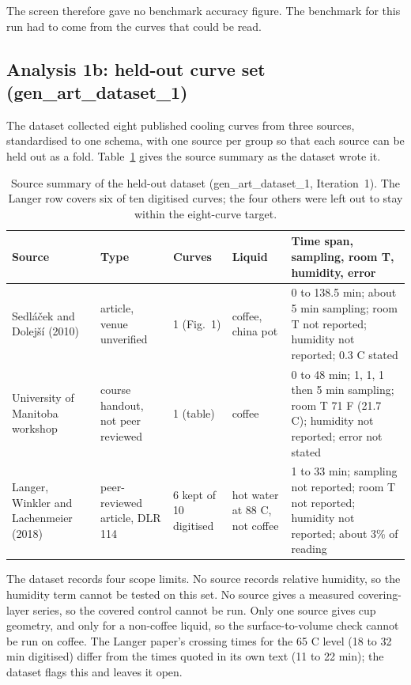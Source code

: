 \documentclass[11pt,letterpaper]{article}
\begin{document}
The screen therefore gave no benchmark accuracy figure. The benchmark for this run had to come from the curves that could be read.

\subsection{Analysis 1b: held-out curve set (gen\_art\_dataset\_1)}

The dataset collected eight published cooling curves from three sources, standardised to one schema, with one source per group so that each source can be held out as a fold. Table~\ref{tab:it1-sources} gives the source summary as the dataset wrote it.

\begin{table}[!htbp]
\centering
\small
\caption{Source summary of the held-out dataset (gen\_art\_dataset\_1, Iteration~1). The Langer row covers six of ten digitised curves; the four others were left out to stay within the eight-curve target.}
\label{tab:it1-sources}
\begin{tabularx}{\linewidth}{p{3.2cm}p{2.6cm}p{1.8cm}p{2.6cm}X}
\toprule
Source & Type & Curves & Liquid & Time span, sampling, room T, humidity, error \\
\midrule
Sedl\'{a}\v{c}ek and Dolej\v{s}\'{i} (2010) & article, venue unverified & 1 (Fig.~1) & coffee, china pot & 0 to 138.5 min; about 5 min sampling; room T not reported; humidity not reported; 0.3 C stated \\
University of Manitoba workshop & course handout, not peer reviewed & 1 (table) & coffee & 0 to 48 min; 1, 1, 1 then 5 min sampling; room T 71 F (21.7 C); humidity not reported; error not stated \\
Langer, Winkler and Lachenmeier (2018) & peer-reviewed article, DLR 114 & 6 kept of 10 digitised & hot water at 88 C, not coffee & 1 to 33 min; sampling not reported; room T not reported; humidity not reported; about 3\% of reading \\
\bottomrule
\end{tabularx}
\end{table}

The dataset records four scope limits. No source records relative humidity, so the humidity term cannot be tested on this set. No source gives a measured covering-layer series, so the covered control cannot be run. Only one source gives cup geometry, and only for a non-coffee liquid, so the surface-to-volume check cannot be run on coffee. The Langer paper's crossing times for the 65 C level (18 to 32 min digitised) differ from the times quoted in its own text (11 to 22 min); the dataset flags this and leaves it open.
\end{document}
